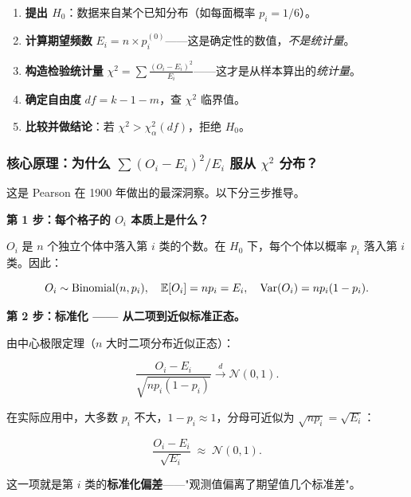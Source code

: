 \begin{enumerate}[label=\textbf{第 \arabic* 步}, leftmargin=*]
    \item \textbf{提出 $H_0$}：数据来自某个已知分布（如每面概率 $p_i = 1/6$）。
    \item \textbf{计算期望频数} $E_i = n \times p_i^{(0)}$——这是确定性的数值，\emph{不是统计量}。
    \item \textbf{构造检验统计量} $\chi^2 = \sum \frac{(O_i - E_i)^2}{E_i}$——这才是从样本算出的\emph{统计量}。
    \item \textbf{确定自由度} $df = k - 1 - m$，查 $\chi^2$ 临界值。
    \item \textbf{比较并做结论}：若 $\chi^2 > \chi^2_{\alpha}(df)$，拒绝 $H_0$。
\end{enumerate}

\subsubsection{核心原理：为什么 $\sum (O_i-E_i)^2/E_i$ 服从 $\chi^2$ 分布？}

这是 Pearson 在 1900 年做出的最深洞察。以下分三步推导。

\medskip
\textbf{第 1 步：每个格子的 $O_i$ 本质上是什么？}

$O_i$ 是 $n$ 个独立个体中落入第 $i$ 类的个数。在 $H_0$ 下，每个个体以概率 $p_i$ 落入第 $i$ 类。因此：

\begin{equation}
    O_i \sim \mathrm{Binomial}(n, p_i), \quad
    \mathbb{E}[O_i] = np_i = E_i, \quad
    \mathrm{Var}(O_i) = np_i(1-p_i).
\end{equation}

\medskip
\textbf{第 2 步：标准化 —— 从二项到近似标准正态。}

由中心极限定理（$n$ 大时二项分布近似正态）：

\begin{equation}
    \frac{O_i - E_i}{\sqrt{np_i(1-p_i)}} \xrightarrow{d} \mathcal{N}(0,1).
\end{equation}

在实际应用中，大多数 $p_i$ 不大，$1-p_i \approx 1$，分母可近似为 $\sqrt{np_i} = \sqrt{E_i}$：

\begin{equation}
    \boxed{\frac{O_i - E_i}{\sqrt{E_i}} \;\approx\; \mathcal{N}(0,1)}.
\end{equation}

这一项就是第 $i$ 类的\textbf{标准化偏差}——"观测值偏离了期望值几个标准差"。

